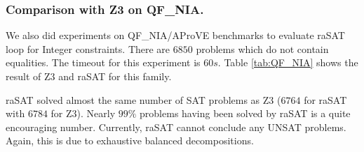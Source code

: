 \documentclass[runningheads,a4paper,oribibl]{llncs}
\begin{document}
\subsubsection{Comparison with Z3 on QF\_NIA.}
We also did experiments on QF\_NIA/AProVE benchmarks to evaluate raSAT loop for Integer constraints. There are $6850$ problems which do not contain equalities. The timeout for this experiment is $60s$. Table \ref{tab:QF_NIA} shows the result of Z3 and raSAT for this family.

\begin{table*}[t]
\centering
{}
    \medskip
   	\caption{Experiments on QF\_NIA/AProVE}
   	\label{tab:QF_NIA}
\end{table*}
 
raSAT solved almost the same number of SAT problems as Z3 ($6764$ for raSAT with $6784$ for Z3). Nearly $99\%$ problems having been solved by raSAT is a quite encouraging number. 
Currently, raSAT cannot conclude any UNSAT problems. Again, this is due to exhaustive balanced decompositions.
\end{document}
